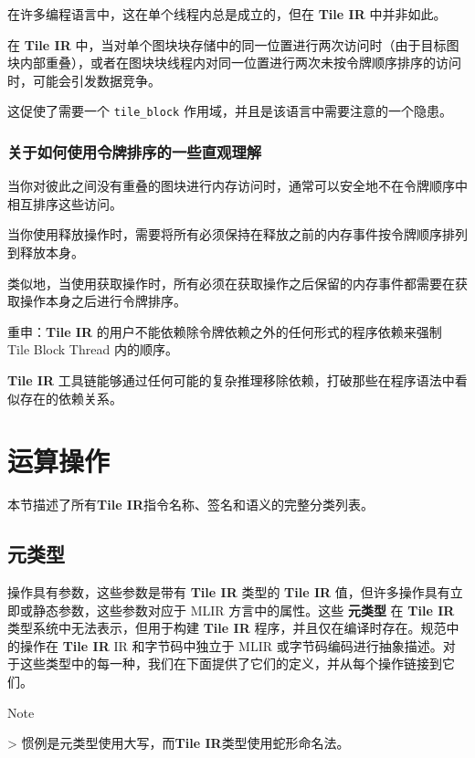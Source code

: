 \documentclass{article}
\begin{document}
在许多编程语言中，这在单个线程内总是成立的，但在 \textbf{Tile IR} 中并非如此。

在 \textbf{Tile IR} 中，当对单个图块块存储中的同一位置进行两次访问时（由于目标图块内部重叠），或者在图块块线程内对同一位置进行两次未按令牌顺序排序的访问时，可能会引发数据竞争。

这促使了需要一个 \texttt{tile\_block} 作用域，并且是该语言中需要注意的一个隐患。



\subsubsection{关于如何使用令牌排序的一些直观理解}

当你对彼此之间没有重叠的图块进行内存访问时，通常可以安全地不在令牌顺序中相互排序这些访问。

当你使用释放操作时，需要将所有必须保持在释放之前的内存事件按令牌顺序排列到释放本身。

类似地，当使用获取操作时，所有必须在获取操作之后保留的内存事件都需要在获取操作本身之后进行令牌排序。


重申：\textbf{Tile IR} 的用户不能依赖除令牌依赖之外的任何形式的程序依赖来强制 Tile Block Thread 内的顺序。

\textbf{Tile IR} 工具链能够通过任何可能的复杂推理移除依赖，打破那些在程序语法中看似存在的依赖关系。


\newpage
\section{运算操作}

本节描述了所有\textbf{Tile IR}指令名称、签名和语义的完整分类列表。


\subsection{元类型}

操作具有参数，这些参数是带有 \textbf{Tile IR} 类型的 \textbf{Tile IR} 值，但许多操作具有立即或静态参数，这些参数对应于 MLIR 方言中的属性。这些 \textbf{元类型} 在 \textbf{Tile IR} 类型系统中无法表示，但用于构建 \textbf{Tile IR} 程序，并且仅在编译时存在。规范中的操作在 \textbf{Tile IR} IR 和字节码中独立于 MLIR 或字节码编码进行抽象描述。对于这些类型中的每一种，我们在下面提供了它们的定义，并从每个操作链接到它们。


Note

> 惯例是元类型使用大写，而\textbf{Tile IR}类型使用蛇形命名法。
\end{document}
